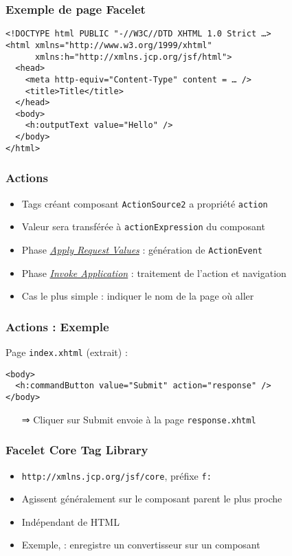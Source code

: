 \documentclass[english, french]{beamer}
\begin{document}
\begin{frame}[fragile]
	\frametitle{Exemple de page Facelet}
	\begin{lstlisting}
<!DOCTYPE html PUBLIC "-//W3C//DTD XHTML 1.0 Strict …>
<html xmlns="http://www.w3.org/1999/xhtml"
      xmlns:h="http://xmlns.jcp.org/jsf/html">
  <head>
    <meta http-equiv="Content-Type" content = … />
    <title>Title</title>
  </head>
  <body>
    <h:outputText value="Hello" />
  </body>
</html>
	\end{lstlisting}
\end{frame}
	
\begin{frame}
	\frametitle{Actions}
	\begin{itemize}
		\item Tags créant composant \texttt{ActionSource2} a propriété \texttt{action}
		\item Valeur sera transférée à \texttt{actionExpression} du composant
		\item Phase \hyperlink{ph-arv}{\emph{Apply Request Values}} : génération de \texttt{ActionEvent}
		\item Phase \hyperlink{ph-ia}{\emph{Invoke Application}} : traitement de l’action et navigation
		\item Cas le plus simple : indiquer le nom de la page où aller
	\end{itemize}
\end{frame}

\begin{frame}[fragile]
	\frametitle{Actions : Exemple}
	Page \texttt{index.xhtml} (extrait) :
	\begin{lstlisting}[aboveskip=1em, belowskip=1em]
<body>
  <h:commandButton value="Submit" action="response" />
</body>
	\end{lstlisting}
	\begin{itemize}
		\item[⇒] Cliquer sur Submit envoie à la page \texttt{response.xhtml}
	\end{itemize}
\end{frame}

\begin{frame}
	\frametitle{Facelet Core Tag Library}
	\begin{itemize}
		\item \texttt{http://xmlns.jcp.org/jsf/core}, préfixe \texttt{f:}
		\item Agissent {\tiny généralement} sur le composant parent le plus proche
		\item Indépendant de HTML
		\item Exemple,  : enregistre un convertisseur sur un composant
	\end{itemize}
\end{frame}
\end{document}
